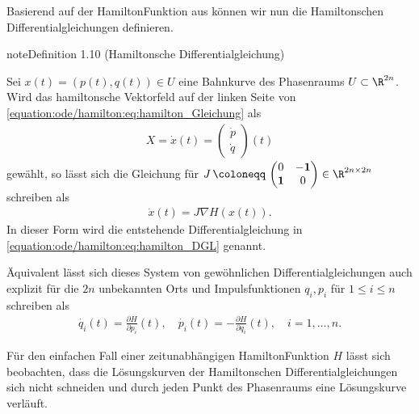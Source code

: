 \documentclass[letterpaper,10pt,german]{jupyterBook}
\begin{document}
\sphinxAtStartPar
Basierend auf der Hamilton\sphinxhyphen{}Funktion aus {\hyperref[\detokenize{ode/hamilton:def:hamiltonsch}]{}} können wir nun die Hamiltonschen Differentialgleichungen definieren.
\label{ode/hamilton:definition-2}
\begin{sphinxadmonition}{note}{Definition 1.10 (Hamiltonsche Differentialgleichung)}



\sphinxAtStartPar
Sei \(x(t) = (p(t),q(t)) \in U\) eine Bahnkurve des Phasenraums \(U \subset \R^{2n}\).
Wird das hamiltonsche Vektorfeld auf der linken Seite von \eqref{equation:ode/hamilton:eq:hamilton_Gleichung} als
\begin{equation*}
\begin{split}X = \dot{x}(t) = \begin{pmatrix} \dot{p} \\ \dot{q} \end{pmatrix} (t)\end{split}
\end{equation*}
\sphinxAtStartPar
gewählt, so lässt sich die Gleichung für \(J \, \coloneqq \, \begin{pmatrix}0 & -\mathbf{1}\\ \mathbf{1} & 0 \end{pmatrix} \in \R^{2n \times 2n}\) schreiben als
\begin{equation}\label{equation:ode/hamilton:eq:hamilton_DGL}
\begin{split}\dot{x}(t) = J \nabla H(x(t)).\end{split}
\end{equation}
\sphinxAtStartPar
In dieser Form wird die entstehende Differentialgleichung in \eqref{equation:ode/hamilton:eq:hamilton_DGL}  genannt.

\sphinxAtStartPar
Äquivalent lässt sich dieses System von gewöhnlichen Differentialgleichungen auch explizit für die \(2n\) unbekannten Orts\sphinxhyphen{} und Impulsfunktionen \(q_i, p_i\) für \(1 \leq i \leq n\) schreiben als
\begin{equation*}
\begin{split}\dot{q_i}(t) = \frac{\partial H}{\partial p_i}(t), \quad \dot{p_i}(t) = -\frac{\partial H}{\partial q_i}(t), \quad i=1,\ldots,n.\end{split}
\end{equation*}\end{sphinxadmonition}

\sphinxAtStartPar
Für den einfachen Fall einer zeitunabhängigen Hamilton\sphinxhyphen{}Funktion \(H\) lässt sich beobachten, dass die Lösungskurven der Hamiltonschen Differentialgleichungen sich nicht schneiden und durch jeden Punkt des Phasenraums eine Lösungskurve verläuft.
\end{document}
